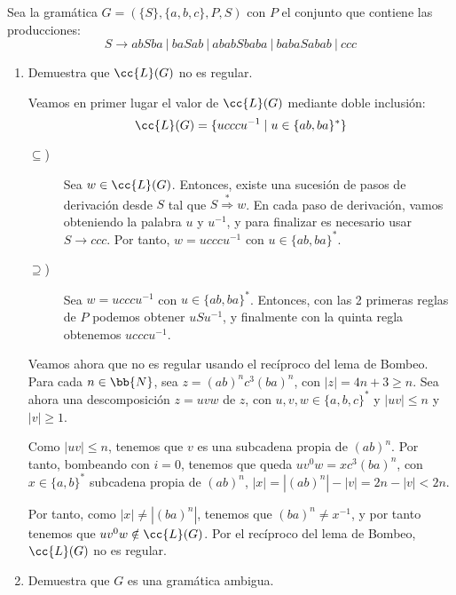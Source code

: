 \documentclass[12pt]{article}
\begin{document}
\begin{ejercicio}
    Sea la gramática $G=(\{S\},\{a,b,c\},P,S)$ con $P$ el conjunto que contiene las producciones:
    \begin{equation*}
        S \rightarrow abSba\ |\ baSab\ |\ ababSbaba\ |\ babaSabab\ |\ ccc
    \end{equation*}
    \begin{enumerate}
        \item Demuestra que $\cc{L}(G)$ no es regular.
        
        Veamos en primer lugar el valor de $\cc{L}(G)$ mediante doble inclusión:
        \begin{equation*}
            \cc{L}(G)=\{ucccu^{-1}\mid u\in \{ab, ba\}^{\ast}\}
        \end{equation*}
        \begin{description}
            \item[$\subseteq$)] Sea $w\in \cc{L}(G)$. Entonces, existe una sucesión de pasos de derivación desde $S$ tal que $S\stackrel{\ast}{\Longrightarrow}w$. En cada paso de derivación, vamos obteniendo la palabra $u$ y $u^{-1}$, y para finalizar es necesario usar $S\to ccc$. Por tanto, $w=ucccu^{-1}$ con $u\in \{ab, ba\}^{\ast}$.
            
            \item[$\supseteq$)] Sea $w=ucccu^{-1}$ con $u\in \{ab, ba\}^{\ast}$. Entonces, con las 2 primeras reglas de $P$ podemos obtener $uSu^{-1}$, y finalmente con la quinta regla obtenemos $ucccu^{-1}$.
        \end{description}

        Veamos ahora que no es regular usando el recíproco del lema de Bombeo.
        Para cada $n\in\bb{N}$, sea $z=(ab)^n c^3 (ba)^n$, con $|z|=4n+3\geq n$.
        Sea ahora una descomposición $z=uvw$ de $z$, con $u,v,w\in \{a,b,c\}^{\ast}$ y $|uv|\leq n$ y $|v|\geq 1$.

        Como $|uv|\leq n$, tenemos que $v$ es una subcadena propia de $(ab)^n$. Por tanto, bombeando con $i=0$, tenemos que queda $uv^0w = xc^3(ba)^n$, con $x\in \{a,b\}^*$ subcadena propia de $(ab)^n$, $|x|=|(ab)^n| - |v| =2n-|v|<2n$.

        Por tanto, como $|x|\neq |(ba)^n|$, tenemos que $(ba)^n\neq x^{-1}$, y por tanto tenemos que $uv^0w\notin \cc{L}(G)$. Por el recíproco del lema de Bombeo, $\cc{L}(G)$ no es regular.
        \item Demuestra que $G$ es una gramática ambigua.
        

\end{enumerate}
\end{ejercicio}
\end{document}

